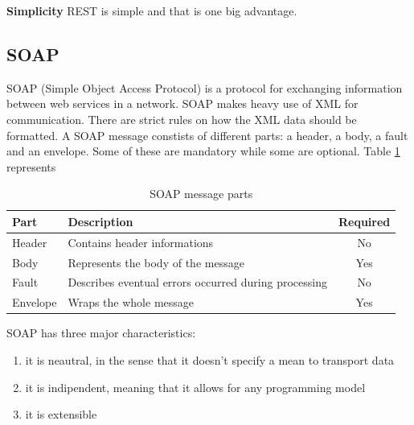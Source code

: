 \textbf{Simplicity}\newline
REST is simple and that is one big advantage.

\subsection{SOAP}\cite{SOAP}
\label{subsec:soap}
SOAP (Simple Object Access Protocol) is a protocol for exchanging information between web services in a network.
SOAP makes heavy use of XML for communication. There are strict rules on how the XML data should be formatted.
A SOAP message constists of different parts: a header, a body, a fault and an envelope. Some of these
are mandatory while some are optional. Table \ref{table:soap-message} represents

\begin{table}[h]
\begin{center}
\begin{tabular}{ | l | l | c | }
  \hline
  Part  & Description & Required \\
  \hline\noalign{\smallskip}\hline
  Header & Contains header informations & No \\
  Body   & Represents the body of the message   & Yes \\
  Fault  & Describes eventual errors occurred during processing  & No \\
  Envelope & Wraps the whole message & Yes \\
  \hline
\end{tabular}
\end{center}
\caption{SOAP message parts}
\label{table:soap-message}
\end{table}


SOAP has three major characteristics:
\begin{enumerate}[1.]
\item it is neautral, in the sense that it doesn't specify a mean to transport data
\item it is indipendent, meaning that it allows for any programming model
\item it is extensible
\end{enumerate}

